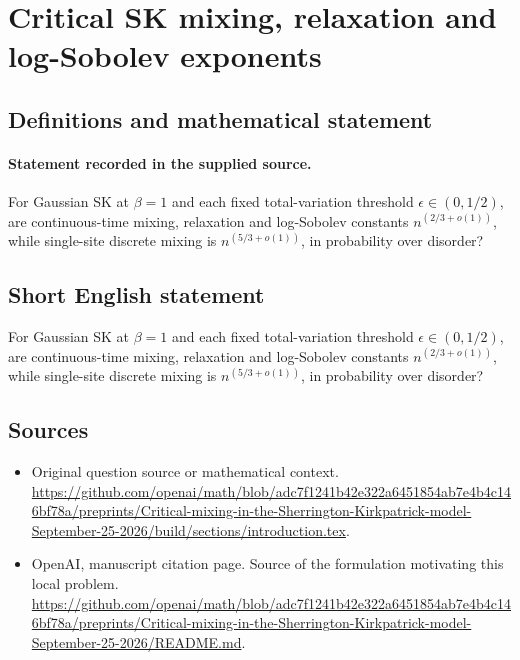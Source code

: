 \documentclass[11pt]{article}
\begin{document}
\section*{Critical SK mixing, relaxation and log-Sobolev exponents}\label{statement}
\subsection{Definitions and mathematical statement}
\paragraph{Statement recorded in the supplied source.}
For Gaussian SK at $\beta =1$ and each fixed total-variation threshold $\epsilon \in (0,1/2)$, are continuous-time mixing, relaxation and log-Sobolev constants $n^(2/3+o(1))$, while single-site discrete mixing is $n^(5/3+o(1))$, in probability over disorder?
\subsection{Short English statement}
For Gaussian SK at $\beta =1$ and each fixed total-variation threshold $\epsilon \in (0,1/2)$, are continuous-time mixing, relaxation and log-Sobolev constants $n^(2/3+o(1))$, while single-site discrete mixing is $n^(5/3+o(1))$, in probability over disorder?
\subsection{Sources}
\begin{itemize}
\item[S1] Original question source or mathematical context.
\url{https://github.com/openai/math/blob/adc7f1241b42e322a6451854ab7e4b4c146bf78a/preprints/Critical-mixing-in-the-Sherrington-Kirkpatrick-model-September-25-2026/build/sections/introduction.tex}.
\item[S2] OpenAI, manuscript citation page. Source of the formulation motivating this local problem.
\url{https://github.com/openai/math/blob/adc7f1241b42e322a6451854ab7e4b4c146bf78a/preprints/Critical-mixing-in-the-Sherrington-Kirkpatrick-model-September-25-2026/README.md}.
\end{itemize}
\end{document}
